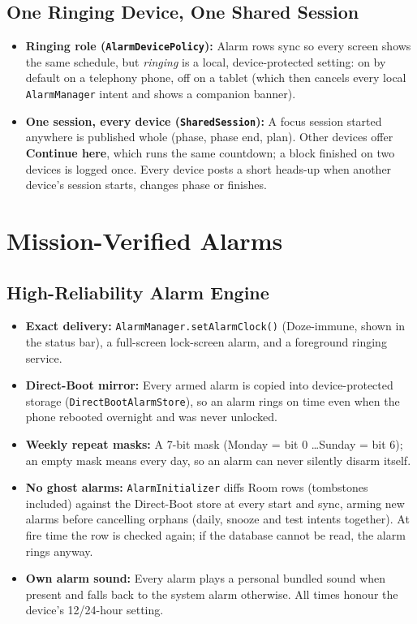 \documentclass[11pt,a4paper]{article}
\begin{document}
\subsection{One Ringing Device, One Shared Session}
\begin{itemize}
  \item \textbf{Ringing role (\texttt{AlarmDevicePolicy}):} Alarm rows sync so every screen shows the same schedule, but \emph{ringing} is a local, device-protected setting: on by default on a telephony phone, off on a tablet (which then cancels every local \texttt{AlarmManager} intent and shows a companion banner).
  \item \textbf{One session, every device (\texttt{SharedSession}):} A focus session started anywhere is published whole (phase, phase end, plan). Other devices offer \textbf{Continue here}, which runs the same countdown; a block finished on two devices is logged once. Every device posts a short heads-up when another device's session starts, changes phase or finishes.
\end{itemize}

\section{Mission-Verified Alarms}

\subsection{High-Reliability Alarm Engine}
\begin{itemize}
  \item \textbf{Exact delivery:} \texttt{AlarmManager.setAlarmClock()} (Doze-immune, shown in the status bar), a full-screen lock-screen alarm, and a foreground ringing service.
  \item \textbf{Direct-Boot mirror:} Every armed alarm is copied into device-protected storage (\texttt{DirectBoot\allowbreak AlarmStore}), so an alarm rings on time even when the phone rebooted overnight and was never unlocked.
  \item \textbf{Weekly repeat masks:} A 7-bit mask (Monday = bit 0 \dots Sunday = bit 6); an empty mask means every day, so an alarm can never silently disarm itself.
  \item \textbf{No ghost alarms:} \texttt{AlarmInitializer} diffs Room rows (tombstones included) against the Direct-Boot store at every start and sync, arming new alarms before cancelling orphans (daily, snooze and test intents together). At fire time the row is checked again; if the database cannot be read, the alarm rings anyway.
  \item \textbf{Own alarm sound:} Every alarm plays a personal bundled sound when present and falls back to the system alarm otherwise. All times honour the device's 12/24-hour setting.
\end{itemize}
\end{document}
